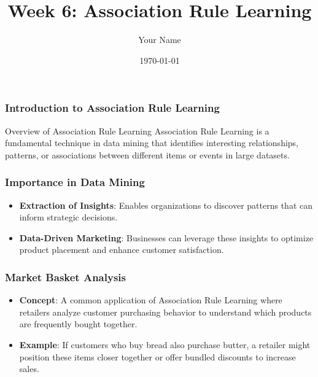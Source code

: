 \documentclass{beamer}
\title{Week 6: Association Rule Learning}
\author{Your Name}
\institute{Your Institution}
\date{\today}
\begin{document}
\frame{\titlepage}

\begin{frame}[fragile]
    \frametitle{Introduction to Association Rule Learning}
    \begin{block}{Overview of Association Rule Learning}
        Association Rule Learning is a fundamental technique in data mining that identifies interesting relationships, patterns, or associations between different items or events in large datasets.
    \end{block}
\end{frame}

\begin{frame}[fragile]
    \frametitle{Importance in Data Mining}
    \begin{itemize}
        \item \textbf{Extraction of Insights}: 
        Enables organizations to discover patterns that can inform strategic decisions.
        \item \textbf{Data-Driven Marketing}: 
        Businesses can leverage these insights to optimize product placement and enhance customer satisfaction.
    \end{itemize}
\end{frame}

\begin{frame}[fragile]
    \frametitle{Market Basket Analysis}
    \begin{itemize}
        \item \textbf{Concept}: 
        A common application of Association Rule Learning where retailers analyze customer purchasing behavior to understand which products are frequently bought together.
        \item \textbf{Example}: 
        If customers who buy bread also purchase butter, a retailer might position these items closer together or offer bundled discounts to increase sales.
    \end{itemize}
\end{frame}
\end{document}
